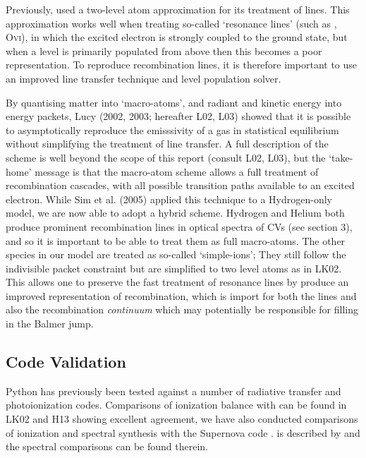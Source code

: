\documentclass[useAMS,usenatbib,onecolumn]{mn2e2}
\begin{document}
Previously, \py used a two-level atom approximation \cite[see e.g.][]{mihalas} for its treatment of lines. This approximation works well when treating so-called `resonance lines' (such as \civ, O\textsc{vi}), 
in which the excited electron is strongly coupled to the ground state, but when a level is primarily populated from above then this becomes a poor representation. To reproduce recombination lines, it is therefore
important to use an improved line transfer technique and level population solver.

By quantising matter into `macro-atoms', and radiant and kinetic energy into energy packets, 
Lucy (2002, 2003\nocite{lucy2002, lucy2003}; hereafter L02, L03) showed that it is possible 
to asymptotically reproduce the emisssivity of a gas in statistical equilibrium 
without simplifying the treatment of line transfer. A full description of the scheme 
is well beyond the scope of this report (consult L02, L03), but the `take-home' message is
that the macro-atom scheme allows a full treatment of recombination cascades,
with all possible transition paths available to an excited electron.
While Sim et al. (2005) applied this technique to
a Hydrogen-only model, we are now able to adopt a hybrid scheme. Hydrogen and Helium both produce
prominent recombination lines in optical spectra of CVs (see section 3), and so it is important
to be able to treat them as full
macro-atoms. The other species in our model are treated as so-called `simple-ions'; They still
follow the indivisible packet constraint but are simplified to two level atoms
as in LK02. This allows one to preserve the fast treatment of resonance lines by 
produce an improved representation of recombination, which is import for both the 
lines and also the recombination {\sl continuum} which may potentially be responsible for filling in the
Balmer jump.



\subsection{Code Validation}

Python has previously been tested against a number of radiative transfer and
photoionization codes. Comparisons of ionization balance with \cld \citep{cloudy2013} 
can be found in LK02 and H13 showing excellent agreement, we have also conducted comparisons
of ionization and spectral synthesis with the Supernova code \tar. \tar is described by
\citep{kerzendorfsim} and the spectral comparisons can be found therein.
\end{document}
